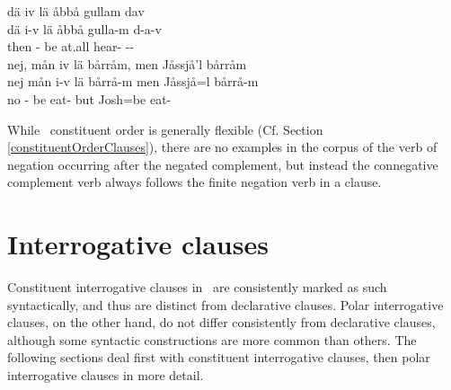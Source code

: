  
\z
\ea\label{negation5}%
\glll	dä iv lä åbbå gullam dav\\
	dä i-v lä åbbå gulla-m d-a-v\\
	then - be\BS{} at.all hear- --\\\nopagebreak
{} 
\z
\ea\label{negation6}%
\glll	nej, mån iv lä bårråm, men Jåssjå'l bårråm\\
	nej mån i-v lä bårrå-m men Jåssjå=l bårrå-m\\
	no  - be\BS{} eat- but Josh\BS{}=be\BS{} eat-\\\nopagebreak
{} 
\z

While \PS\ constituent order is generally flexible (Cf. Section \ref{constituentOrderClauses}), there are no examples in the corpus of the verb of negation occurring after the negated complement, but instead the connegative complement verb always follows the finite negation verb in a clause. 

\section{Interrogative clauses}\label{interrogClauses}
Constituent interrogative clauses in \PS\ are consistently marked as such syntactically, and thus are distinct from declarative clauses. Polar interrogative clauses, on the other hand, do not differ consistently from declarative clauses, although some syntactic constructions are more common than others. The following sections deal first with constituent interrogative clauses, then polar interrogative clauses in more detail.

